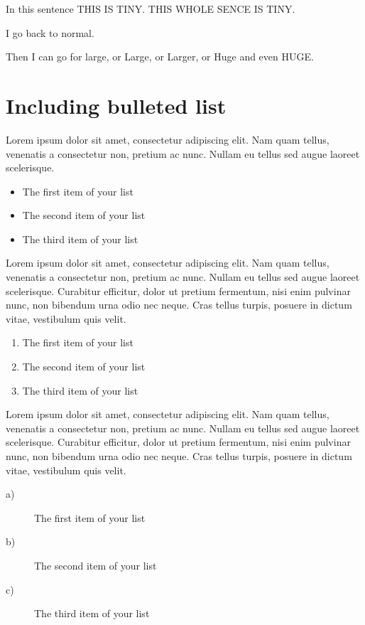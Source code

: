 In this sentence {\tiny{THIS IS TINY}}.
\tiny THIS WHOLE SENCE IS TINY.

\normalsize I go back to normal.

Then I can go for {\large{large}}, or {\Large{Large}}, or {\LARGE{Larger}}, or {\huge{Huge}} and even {\Huge{HUGE}}.

\section{Including bulleted list}
Lorem ipsum dolor sit amet, consectetur adipiscing elit. Nam quam tellus, venenatis a consectetur non, pretium ac nunc. Nullam eu tellus sed augue laoreet scelerisque. 

\begin{itemize}
    \item The first item of your list
    \item The second item of your list
    \item The third item of your list
\end{itemize}

Lorem ipsum dolor sit amet, consectetur adipiscing elit. Nam quam tellus, venenatis a consectetur non, pretium ac nunc. Nullam eu tellus sed augue laoreet scelerisque. Curabitur efficitur, dolor ut pretium fermentum, nisi enim pulvinar nunc, non bibendum urna odio nec neque. Cras tellus turpis, posuere in dictum vitae, vestibulum quis velit.

\begin{enumerate}
    \item The first item of your list
    \item The second item of your list
    \item The third item of your list
\end{enumerate}

Lorem ipsum dolor sit amet, consectetur adipiscing elit. Nam quam tellus, venenatis a consectetur non, pretium ac nunc. Nullam eu tellus sed augue laoreet scelerisque. Curabitur efficitur, dolor ut pretium fermentum, nisi enim pulvinar nunc, non bibendum urna odio nec neque. Cras tellus turpis, posuere in dictum vitae, vestibulum quis velit. 

\begin{description}
    \item[a)] The first item of your list
    \item[b)] The second item of your list
    \item[c)] The third item of your list
\end{description}
 

